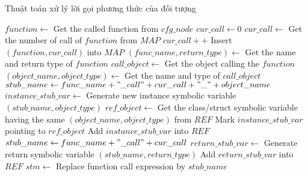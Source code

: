 \begin{algorithm}[H]
    \small
    \caption{Thuật toán xử lý lời gọi phương thức của đối tượng}
    \label{alg:autostub-object}
    $function \leftarrow$ Get the called function from $cfg\_node$\;
    $cur\_call \leftarrow 0$\;
     {
        $cur\_call \leftarrow $ Get the number of call of $function$ from $MAP$\; 
    }
    $cur\_call++$\;
    Insert $(function, cur\_call)$ into $MAP$\;
    $(func\_name, return\_type) \leftarrow$ Get the name and return type of $function$\;
    $call\_object \leftarrow$ Get the object calling the $function$\;
     {
        $(object\_name, object\_type) \leftarrow$ Get the name and type of $call\_object$\;
        $stub\_name \leftarrow func\_name + "\_call" + cur\_call + "\_" + object\_name$\;
        $instance\_stub\_var \leftarrow$ Generate new instance symbolic variable $(stub\_name, object\_type)$\;
        $ref\_object \leftarrow$ Get the class/struct symbolic variable having the same $(object\_name, object\_type)$ from $REF$\;
        Mark $instance\_stub\_var$ pointing to $ref\_object$\;
        Add $instance\_stub\_var$ into $REF$\;
    }
     {
        $stub\_name \leftarrow func\_name + "\_call" + cur\_call$\;
        $return\_stub\_var \leftarrow$ Generate return symbolic variable $(stub\_name, return\_type)$\;
        Add $return\_stub\_var$ into $REF$\;
        $stm \leftarrow$ Replace function call expression by $stub\_name$\;
    }
\end{algorithm}

